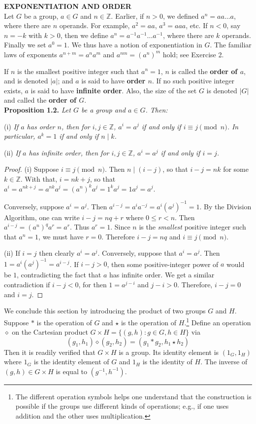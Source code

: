 \documentclass[leqno]{book}
\begin{document}
\noindent\textbf{EXPONENTIATION AND ORDER}\\

\noindent Let $G$ be a group, $a\in G$ and $n\in\mathbb Z$.  Earlier, if $n>0$, we defined $a^n=aa\dots a$, where there are $n$ operands.  For example, $a^2=aa$, $a^3=aaa$, etc.  If $n<0$, say $n=-k$ with $k>0$, then we define $a^n=a^{-1}a^{-1}\dots a^{-1}$, where there are $k$ operands.  Finally we set $a^0=1$.  We thus have a notion of exponentiation in $G$.  The familiar laws of exponents $a^{n+m}=a^na^m$ and $a^{nm}=(a^n)^m$ hold; see Exercise 2.

If $n$ is the smallest positive integer such that $a^n=1$, $n$ is called the \textbf{order of $a$}, and is denoted $|a|$; and $a$ is said to have \textbf{order $n$}.  If no such positive integer exists, $a$ is said to have \textbf{infinite order}.  Also, the size of the set $G$ is denoted $|G|$ and called the \textbf{order of $G$}.\\

\noindent\textbf{Proposition 1.2.} \emph{Let $G$ be a group and $a\in G$.  Then:} %

(i) \emph{If $a$ has order $n$, then for $i,j\in\mathbb Z$, $a^i=a^j$ if and only if $i\equiv j\pmod n$.  In particular, $a^k=1$ if and only if $n\mid k$.}

(ii) \emph{If $a$ has infinite order, then for $i,j\in\mathbb Z$, $a^i=a^j$ if and only if $i=j$.}

\begin{proof}
(i) Suppose $i\equiv j\pmod n$.  Then $n\mid(i-j)$, so that $i-j=nk$ for some $k\in\mathbb Z$.  With that, $i=nk+j$, so that $a^i=a^{nk+j}=a^{nk}a^j=(a^n)^ka^j=1^ka^j=1a^j=a^j$.

Conversely, suppose $a^i=a^j$.  Then $a^{i-j}=a^ia^{-j}=a^i(a^j)^{-1}=1$.  By the Division Algorithm, one can write $i-j=nq+r$ where $0\leqslant r<n$.  Then $a^{i-j}=(a^n)^qa^r=a^r$.  Thus $a^r=1$.  Since $n$ is the \emph{smallest} positive integer such that $a^n=1$, we must have $r=0$.  Therefore $i-j=nq$ and $i\equiv j\pmod n$.

(ii) If $i=j$ then clearly $a^i=a^j$.  Conversely, suppose that $a^i=a^j$.  Then $1=a^i(a^j)^{-1}=a^{i-j}$.  If $i-j>0$, then some positive-integer power of $a$ would be $1$, contradicting the fact that $a$ has infinite order.  We get a similar contradiction if $i-j<0$, for then $1=a^{j-i}$ and $j-i>0$.  Therefore, $i-j=0$ and $i=j$.
\end{proof}

\noindent We conclude this section by introducing the product of two groups $G$ and $H$.  Suppose $*$ is the operation of $G$ and $\star$ is the operation of $H$.\footnote{The different operation symbols helps one understand that the construction is possible if the groups use different kinds of operations; e.g., if one uses addition and the other uses multiplication.}  Define an operation $\diamond$ on the Cartesian product $G\times H=\{(g,h):g\in G,h\in H\}$ via
$$(g_1,h_1)\diamond(g_2,h_2)=(g_1*g_2,h_1\star h_2)$$
Then it is readily verified that $G\times H$ is a group.  Its identity element is $(1_G,1_H)$ where $1_G$ is the identity element of $G$ and $1_H$ is the identity of $H$.  The inverse of $(g,h)\in G\times H$ is equal to $(g^{-1},h^{-1})$.
\end{document}
